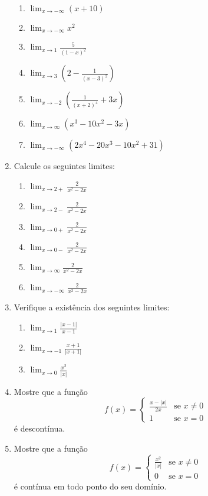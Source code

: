 \documentclass[12pt,a4paper]{article}
\newcommand{\dpar}[1]{\left(#1\right)}
\newcommand{\ds}{\displaystyle}
\begin{document}
\begin{enumerate}
\begin{enumerate}
  \item $\ds\lim_{x\to-\infty}(x+10)$
  \item $\ds\lim_{x\to-\infty}x^2$
  \item $\ds \lim_{x\to 1}\frac{5}{(1-x)^2}$
  \item $\ds\lim_{x\to 3}\dpar{2-\frac{1}{(x-3)^2}}$
  \item $\ds\lim_{x\to -2}\dpar{\frac{1}{(x+2)^4}+3x}$
  \item $\ds\lim_{x\to \infty}(x^3-10x^2-3x)$
  \item $\ds\lim_{x\to-\infty}(2x^4-20x^3-10x^2+31)$
  \end{enumerate}
\item Calcule os seguintes limites:
  \begin{enumerate}
  \item $\ds \lim_{x\to 2+}\frac{2}{x^2-2x}$
  \item $\ds \lim_{x\to 2-}\frac{2}{x^2-2x}$
  \item $\ds\lim_{x\to 0+}\frac{2}{x^2-2x}$
  \item $\ds\lim_{x\to 0-}\frac{2}{x^2-2x}$
  \item $\ds\lim_{x\to \infty}\frac{2}{x^2-2x}$
  \item $\ds\lim_{x\to -\infty}\frac{2}{x^2-2x}$
  \end{enumerate}
\item Verifique a existência dos seguintes limites:
  \begin{enumerate}
  \item $\ds\lim_{x\to 1}\frac{|x-1|}{x-1}$
  \item $\ds\lim_{x\to-1}\frac{x+1}{|x+1|}$
  \item $\ds\lim_{x\to 0}\frac{x^2}{|x|}$
  \end{enumerate}
\item Mostre que a função
  $$f(x)=
  \begin{cases}
    \ds\frac{x-|x|}{2x}&\text{se $x\ne 0$}\\
    1&\text{se $x=0$}
  \end{cases}
  $$
  é descontínua.
\item Mostre que a função
  $$f(x)=
  \begin{cases}
    \ds\frac{x^2}{|x|}&\text{se $x\ne 0$}\\
    0&\text{se $x=0$}
  \end{cases}
  $$
  é contínua em todo ponto do seu domínio.
\end{enumerate}
\end{document}
